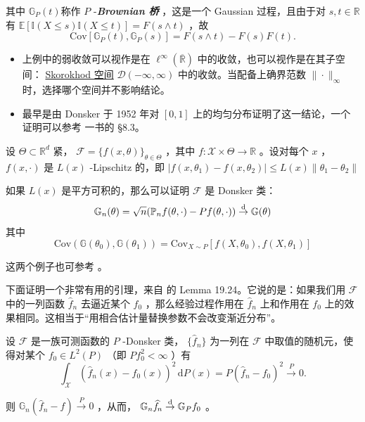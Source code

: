 其中 $\mathbb G_P(t)$称作 $P$ -\textbf{\emph{Brownian 桥}} ，这是一个 Gaussian 过程，且由于对 $s,t\in\mathbb R$ 有 $\mathbb E[\mathbb I(X\le s)\mathbb I(X\le t)]=F(s\wedge t)$ ，故
\[
\mathrm{Cov}[\mathbb G_P(t),\mathbb G_P(s)]=F(s\wedge t)-F(s)F(t).
\]

\begin{remark}

\begin{itemize}
\tightlist
\item
  上例中的弱收敛可以视作是在 $\ell^\infty(\overline{\mathbb R})$ 中的收敛，也可以视作是在其子空间： \href{https://en.wikipedia.org/wiki/Skorokhod_space}{Skorokhod 空间} $\mathcal D(-\infty,\infty)$ 中的收敛。当配备上确界范数 $\|\cdot\|_\infty$ 时，选择哪个空间并不影响结论。
\item
  最早是由 Donsker 于 1952 年对 $[0,1]$ 上的均匀分布证明了这一结论，一个证明可以参考 \cite{linluzhang2023} 一书的 §8.3。
\end{itemize}
\end{remark}

\begin{example}\label{ex:ch9:lipschitz-function}
设 $\Theta\subset\mathbb R^d$ 紧， $\mathscr F=\{f(x,\theta)\}_{\theta\in\Theta}$ ，其中 $f:\mathscr X\times \Theta\to\mathbb R$ 。设对每个 $x$ ， $f(x,\cdot)$ 是 $L(x)$ -Lipschitz 的，即 $|f(x,\theta_1)-f(x,\theta_2)|\le L(x)\|\theta_1-\theta_2\|$

如果 $L(x)$ 是平方可积的，那么可以证明 $\mathscr F$ 是 Donsker 类： 
$$\mathbb G_n(\theta)=\sqrt n(\mathbb P_nf(\theta,\cdot)-Pf(\theta,\cdot))\overset{\rm d}\to \mathbb G(\theta)$$
其中 
$$\mathrm{Cov}(\mathbb G(\theta_0),\mathbb G(\theta_1))=\mathrm{Cov}_{X\sim P}[f(X,\theta_0),f(X,\theta_1)]$$


\end{example}
这两个例子也可参考 \cite{duchi2018stats300b15}。

下面证明一个非常有用的引理，来自 \cite{vandervaart1998} 的 Lemma 19.24。它说的是：如果我们用 $\mathscr F$ 中的一列函数 $\widehat f\!_n$ 去逼近某个 $f_0$ ，那么经验过程作用在 $\widehat f\!_n$ 上和作用在 $f_0$ 上的效果相同。这相当于``用相合估计量替换参数不会改变渐近分布''。


\begin{lemma}\label{lem:ch9:donsker-random-substitution}

设 $\mathscr{F}$ 是一族可测函数的 $P$ -Donsker 类， $\{\widehat{f}\!_n\}$ 为一列在 $\mathscr{F}$ 中取值的随机元，使得对某个 $f_0\in L^2(P)$ （即 $Pf_0^2<\infty$ ）有
\[
\int_{\mathscr X} (\widehat{f}_n(x) - f_0(x))^2 \,\mathrm{d}P(x) = P(\widehat{f}\!_n - f_0)^2 \overset{P}{\to} 0.
\]

则 $\mathbb G_n(\widehat f\!_n-f)\overset P\to 0$ ，从而， $\mathbb G_n\widehat f\!_n\overset{\rm d}\to \mathbb G_P f_0$ 。

\end{lemma}

